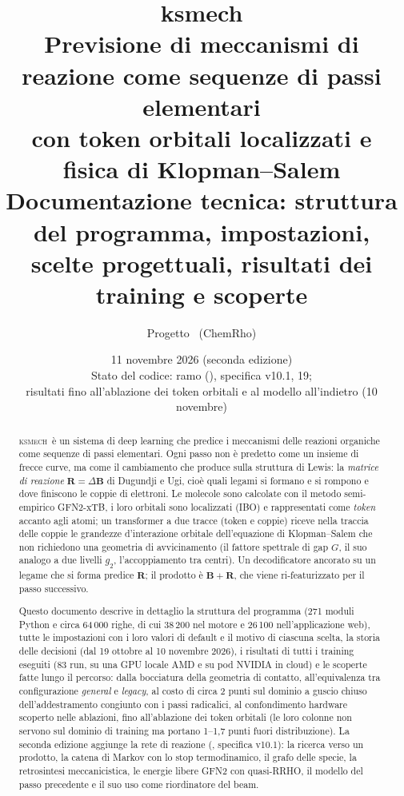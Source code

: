 \documentclass[11pt,a4paper]{report}
\title{%
  {\fontsize{40}{46}\selectfont\bfseries\color{ksblu} ksmech}\\[6pt]
  {\Large Previsione di meccanismi di reazione come sequenze di passi elementari\\
  con token orbitali localizzati e fisica di Klopman--Salem}\\[14pt]
  {\large Documentazione tecnica: struttura del programma, impostazioni,\\
  scelte progettuali, risultati dei training e scoperte}}
\author{Progetto \ksm\ (ChemRho)}
\date{11 novembre 2026 (seconda edizione)\\[4pt]\small Stato del codice: ramo \code{main} (\code{f57a41f}), specifica v10.1,
\code{SAMPLE_VERSION} 19;\\ risultati fino all'ablazione dei token orbitali e al modello all'indietro (10 novembre)}
\newcommand{\code}[1]{\texttt{\detokenize{#1}}}
\newcommand{\vb}[1]{\bm{#1}}
\newcommand{\ksm}{\textsc{ksmech}}
\begin{document}
\maketitle
\thispagestyle{empty}

\begin{abstract}
\noindent
\ksm\ è un sistema di deep learning che predice i meccanismi delle reazioni organiche come
sequenze di passi elementari. Ogni passo non è predetto come un insieme di frecce curve, ma come
il cambiamento che produce sulla struttura di Lewis: la \emph{matrice di reazione}
$\vb{R}=\Delta\vb{B}$ di Dugundji e Ugi, cioè quali legami si formano e si rompono e dove finiscono
le coppie di elettroni. Le molecole sono calcolate con il metodo semi-empirico GFN2-xTB, i loro
orbitali sono localizzati (IBO) e rappresentati come \emph{token} accanto agli atomi; un
transformer a due tracce (token e coppie) riceve nella traccia delle coppie le grandezze
d'interazione orbitale dell'equazione di Klopman--Salem che non richiedono una geometria di
avvicinamento (il fattore spettrale di gap $G$, il suo analogo a due livelli $g_2$, l'accoppiamento
tra centri). Un decodificatore ancorato su un legame che si forma predice $\vb{R}$; il prodotto è
$\vb{B}+\vb{R}$, che viene ri-featurizzato per il passo successivo.

Questo documento descrive in dettaglio la struttura del programma (271 moduli Python e circa
64\,000 righe, di cui 38\,200 nel motore e 26\,100 nell'applicazione web), tutte le impostazioni con i loro valori di
default e il motivo di ciascuna scelta, la storia delle decisioni (dal 19 ottobre al 10 novembre
2026), i risultati di tutti i training eseguiti (83 run, su una GPU locale AMD e su pod NVIDIA in
cloud) e le scoperte fatte lungo il percorso: dalla bocciatura della geometria di contatto,
all'equivalenza tra configurazione \emph{general} e \emph{legacy}, al costo di circa 2 punti sul
dominio a guscio chiuso dell'addestramento congiunto con i passi radicalici, al confondimento
hardware scoperto nelle ablazioni, fino all'ablazione dei token orbitali (le loro colonne non servono
sul dominio di training ma portano 1--1{,}7 punti fuori distribuzione). La seconda edizione aggiunge
la rete di reazione (\code{ksmech.network}, specifica v10.1): la ricerca verso un prodotto, la catena
di Markov con lo stop termodinamico, il grafo delle specie, la retrosintesi meccanicistica, le energie
libere GFN2 con quasi-RRHO, il modello del passo precedente e il suo uso come riordinatore del beam.
\end{abstract}
\end{document}
